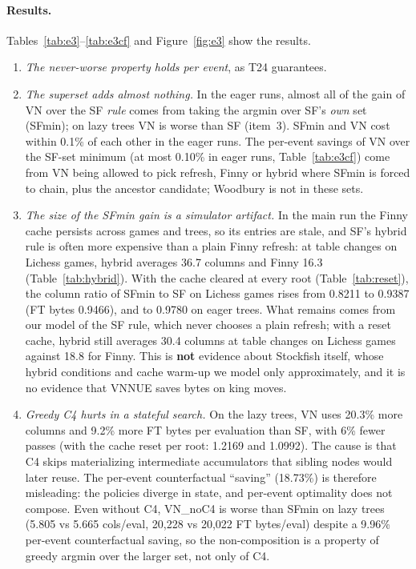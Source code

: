 \paragraph{Results.}
Tables~\ref{tab:e3}--\ref{tab:e3cf} and Figure~\ref{fig:e3} show the results.
\begin{enumerate}[leftmargin=*,itemsep=2pt]
\item \emph{The never-worse property holds per event}, as T24 guarantees.
\item \emph{The superset adds almost nothing.}
In the eager runs, almost all of the gain of VN over the SF \emph{rule} comes from taking the argmin over SF's \emph{own} set (SFmin); on lazy trees VN is worse than SF (item~3).
SFmin and VN cost within 0.1\% of each other in the eager runs.
The per-event savings of VN over the SF-set minimum (at most 0.10\% in eager runs, Table~\ref{tab:e3cf}) come from VN being allowed to pick refresh, Finny or hybrid where SFmin is forced to chain, plus the ancestor candidate; Woodbury is not in these sets.
\item \emph{The size of the SFmin gain is a simulator artifact.}
In the main run the Finny cache persists across games and trees, so its entries are stale, and SF's hybrid rule is often more expensive than a plain Finny refresh: at table changes on Lichess games, hybrid averages 36.7 columns and Finny 16.3 (Table~\ref{tab:hybrid}).
With the cache cleared at every root (Table~\ref{tab:reset}), the column ratio of SFmin to SF on Lichess games rises from 0.8211 to 0.9387 (FT bytes 0.9466), and to 0.9780 on eager trees.
What remains comes from our model of the SF rule, which never chooses a plain refresh; with a reset cache, hybrid still averages 30.4 columns at table changes on Lichess games against 18.8 for Finny.
This is \textbf{not} evidence about Stockfish itself, whose hybrid conditions and cache warm-up we model only approximately, and it is no evidence that VNNUE saves bytes on king moves.
\item \emph{Greedy C4 hurts in a stateful search.}
On the lazy trees, VN uses 20.3\% more columns and 9.2\% more FT bytes per evaluation than SF, with 6\% fewer passes (with the cache reset per root: 1.2169 and 1.0992).
The cause is that C4 skips materializing intermediate accumulators that sibling nodes would later reuse.
The per-event counterfactual ``saving'' (18.73\%) is therefore misleading: the policies diverge in state, and per-event optimality does not compose.
Even without C4, VN\_noC4 is worse than SFmin on lazy trees (5.805 vs 5.665 cols/eval, 20,228 vs 20,022 FT bytes/eval) despite a 9.96\% per-event counterfactual saving, so the non-composition is a property of greedy argmin over the larger set, not only of C4.

\end{enumerate}
